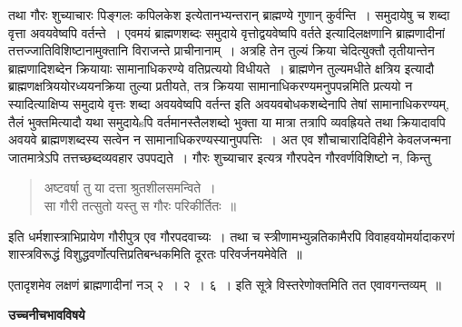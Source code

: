 \documentclass[11pt, openany]{book}
\begin{document}
तथा गौरः शुच्याचारः पिङ्गलः कपिलकेश इत्येतानभ्यन्तरान् ब्राह्मण्ये गुणान् कुर्वन्ति~। समुदायेषु च शब्दा वृत्ता अवयवेष्वपि वर्तन्ते~। एवमयं ब्राह्मणशब्दः समुदाये वृत्तोद्वयवेष्वपि वर्तते इत्यादिलक्षणानि ब्राह्मणादीनां तत्तज्जातिविशिष्टानामुक्तानि विराजन्ते प्राचीनानाम्~। अत्रहि तेन तुल्यं क्रिया चेदित्युक्तौ तृतीयान्तेन ब्राह्मणादिशब्देन क्रियायाः सामानाधिकरण्ये वतिप्रत्ययो विधीयते~। ब्राह्मणेन तुल्यमधीते क्षत्रिय इत्यादौ ब्राह्मणक्षत्रिययोरध्ययनक्रिया तुल्या प्रतीयते, तत्र क्रियया सामानाधिकरण्यमनुपपन्नमिति प्रत्ययो न स्यादित्याक्षिप्य समुदाये वृत्तः शब्दा अवयवेष्वपि वर्तन्त इति अवयवबोधकशब्देनापि तेषां सामानाधिकरण्यम्, तैलं भुक्तमित्यादौ यथा समुदायेsपि वर्तमानस्तैलशब्दो भुक्ता या मात्रा तत्रापि व्यवह्रियते तथा क्रियादावपि अवयवे ब्राह्मणशब्दस्य सत्वेन न सामानाधिकरण्यस्यानुपपत्तिः~। अत एव शौचाचारादिविहीने केवलजन्मना जातमात्रेऽपि तत्तच्छब्दव्यवहार उपपद्यते~। गौरः शुच्याचार इत्यत्र गौरपदेन गौरवर्णविशिष्टो न, किन्तु \textendash\

\begin{quote}
{\qt अष्टवर्षा तु या दत्ता श्रुतशीलसमन्विते~।\\
सा गौरी तत्सुतो यस्तु स गौरः परिकीर्तितः~॥}
\end{quote}

इति धर्मशास्त्राभिप्रायेण गौरीपुत्र एव गौरपदवाच्यः~। तथा च स्त्रीणामभ्युन्नतिकामैरपि विवाहवयोमर्यादाकरणं शास्त्रविरूद्धं विशुद्धवर्णोत्पत्तिप्रतिबन्धकमिति दूरतः परिवर्जनयमेवेति~॥

एतादृशमेव लक्षणं ब्राह्मणादीनां नञ् २~। २~। ६~। इति सूत्रे विस्तरेणोक्तमिति तत एवावगन्तव्यम्~॥

\begin{center}
\textbf{\Large उच्चनीचभावविषये \textendash\ }
\end{center}
\end{document}
